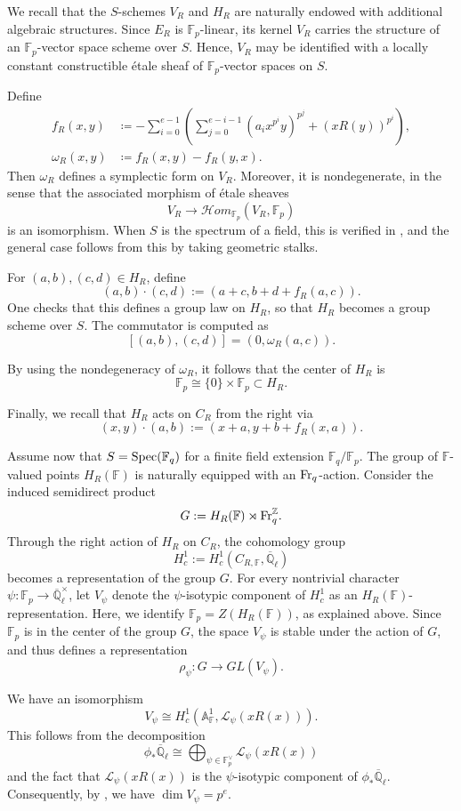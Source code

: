 \documentclass[12pt,a4paper]{amsart}
\theoremstyle{definition}
\def\A{{\mathbb A}}
\def\F{{\mathbb F}}
\def\Z{{\mathbb Z}}
\def\Ql{\overline{\mathbb{Q}}_\ell}
\theoremstyle{remark}
\begin{document}
We recall that the $S$-schemes $V_R$ and $H_R$ are naturally endowed with additional algebraic structures. Since $E_R$ is $\F_p$-linear, its kernel $V_R$ carries the structure of an $\F_p$-vector space scheme over $S$. Hence, $V_R$ may be identified with a locally constant constructible \'etale sheaf of $\F_p$-vector spaces on $S$. 

Define 
\begin{align*}
    f_R(x,y) &\coloneqq -\sum_{i=0}^{e-1}\left(\sum_{j=0}^{e-i-1}(a_i x^{p^i} y)^{p^j}
+(x  R(y))^{p^i}\right),\\
\omega_R(x,y)&\coloneqq f_R(x,y)-f_R(y,x).
\end{align*}
Then $\omega_R$ defines a symplectic form on $V_R$. Moreover, it is nondegenerate, in the sense that the associated morphism of \'etale sheaves 
\[
V_R\to \mathcal{H}om_{\F_p}(V_R,\F_p)
\]
is an isomorphism. When $S$ is the spectrum of a field, this is verified in \cite[Lemma~2.6]{Tsu}, and the general case follows from this by taking geometric stalks. 


For $(a,b),(c,d)\in H_R$, define 
\[
(a,b)\cdot (c,d):=(a+c,b+d+f_R(a,c)). 
\]
One checks that this defines a group law on $H_R$, so that $H_R$ becomes a group scheme over $S$. The commutator is computed as 
\[
[(a,b), (c,d)]=(0,\omega_R(a,c)). 
\]

By using the nondegeneracy of $\omega_R$, it follows that the center of $H_R$ is 
\[
\F_p\cong\{0\}\times\F_p\subset H_R. 
\]

Finally, we recall that $H_R$ acts on $C_R$ from the right via 
\[
(x,y)\cdot (a,b):=(x+a,y+b+f_R(x,a)).
\]

\medskip

Assume now that $S={\rm Spec}(\F_q)$ for a finite field extension $\F_q/\F_p$. The group of $\F$-valued points $H_R(\F)$ 
is naturally equipped with an ${\rm Fr}_q$-action. 
Consider the induced semidirect product 
\[
G:=H_R(\F)\rtimes {\rm Fr}_q^\Z. 
\]
Through the right action of $H_R$ on $C_R$, the cohomology group 
\[
H_c^1:=H_c^1(C_{R,\F},\Ql)
\]
becomes a representation of the group $G$. 
For every nontrivial character $\psi:\F_p\to\Ql^\times$, let $V_\psi$ denote the $\psi$-isotypic component of $H^1_c$ as an $H_R(\F)$-representation. Here, we identify $\F_p=Z(H_R(\F))$, as explained above. Since $\F_p$ is in the center of the group $G$, the space $V_\psi$ is stable under the action of $G$, and thus defines a representation 
\[
\rho_\psi\colon G\to GL(V_\psi). 
\]


We have an isomorphism 
\[
V_\psi\cong H^1_c(\A^1_{\F},\mathcal{L}_\psi(xR(x))). 
\]
This follows from the decomposition 
\[
\phi_\ast\Ql\cong \bigoplus_{\psi\in\F_p^\vee}\mathcal{L}_\psi(xR(x))
\]
and the fact that $\mathcal{L}_\psi(xR(x))$ is the $\psi$-isotypic component of $\phi_\ast\Ql$. Consequently, by \cite[Lemma~3.3]{TT}, we have $\dim V_\psi=p^e$. 
\end{document}
